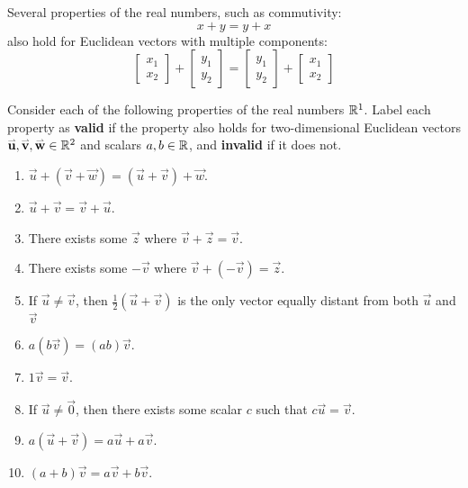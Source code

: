 

\begin{observation}
Several properties of the real numbers, such as commutivity:
\[
  x + y = y + x
\]
also hold for Euclidean vectors with multiple components:
\[
\begin{bmatrix}x_1\\x_2\end{bmatrix}
+
\begin{bmatrix}y_1\\y_2\end{bmatrix}
=
\begin{bmatrix}y_1\\y_2\end{bmatrix}
+
\begin{bmatrix}x_1\\x_2\end{bmatrix}
\]
\end{observation}

\begin{activity}{20}\smallSlideText
Consider each of the following properties of the real numbers
\(\mathbb{R}^1\). Label each property as \textbf{valid} if the property also
holds for two-dimensional Euclidean vectors 
\(\mathbf{\accentset{\rightharpoonup}{u}},\mathbf{\accentset{\rightharpoonup}{v}},\mathbf{\accentset{\rightharpoonup}{w}}\in\mathbb{R}^2\) and scalars \(a,b\in\mathbb{R}\),
and \textbf{invalid} if it does not.
\begin{multicols}{2}
\begin{enumerate}
  \item \(\vec u+(\vec v+\vec w)=
        (\vec u+\vec v)+\vec w\).
  \item \(\vec u+\vec v=
        \vec v+\vec u\).
  \item There exists some \(\vec z\)
        where \(\vec v+\vec z=\vec v\).
  \item There exists some \(-\vec v\)
        where \(\vec v+(-\vec v)=\vec z\).
  \item If \(\vec u\not=\vec v\), then \(\frac{1}{2}(\vec u+\vec v)\)
        is the only vector equally distant from both \(\vec u\) and \(\vec v\)
  \item \(a(b\vec v)=(ab)\vec v\).
  \item \(1\vec v=\vec v\).
  \item If \(\vec u\not=\vec 0\), then there exists some scalar \(c\) 
        such that \(c\vec u=\vec v\).
  \item \(a(\vec u+\vec v)=a\vec u+a\vec v\).
  \item \((a+b)\vec v=a\vec v+b\vec v\).
\end{enumerate}
\end{multicols}
\end{activity}

